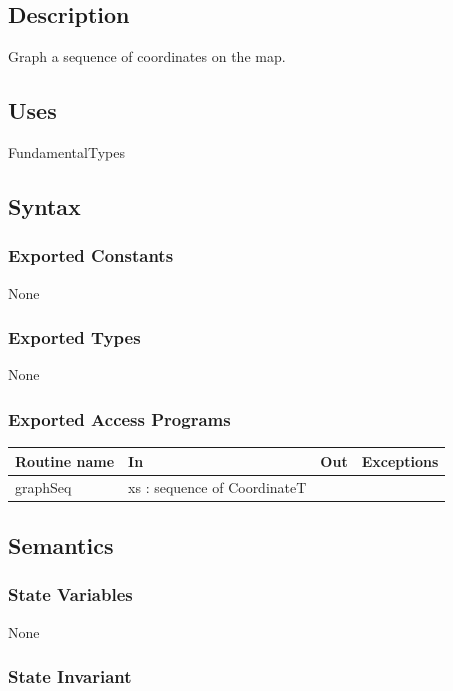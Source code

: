 \documentclass[12pt]{article}
\begin{document}
\subsection*{Description}
Graph a sequence of coordinates on the map.

\subsection* {Uses}

 FundamentalTypes

\subsection* {Syntax}

\subsubsection* {Exported Constants}

None

\subsubsection* {Exported Types}

None

\subsubsection* {Exported Access Programs}

\begin{tabular}{| l | l | l | p{5cm} |}
\hline
\textbf{Routine name} & \textbf{In} & \textbf{Out} & \textbf{Exceptions}\\
\hline
graphSeq & xs : sequence of CoordinateT & ~ & ~\\
\hline
\end{tabular}

\subsection* {Semantics}

\subsubsection* {State Variables}

None

\subsubsection* {State Invariant}
\end{document}
